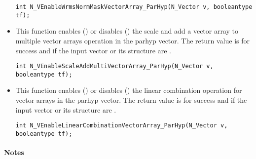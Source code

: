 \begin{itemize}
\verb|int N_VEnableWrmsNormMaskVectorArray_ParHyp(N_Vector v, booleantype tf);|


\item {}

This function enables () or disables () the scale and
add a vector array to multiple vector arrays operation in the parhyp vector. The
return value is  for success and  if the input vector or its
 structure are .

\verb|int N_VEnableScaleAddMultiVectorArray_ParHyp(N_Vector v, booleantype tf);|


\item {}

This function enables () or disables () the linear
combination operation for vector arrays in the parhyp vector. The return value
is  for success and  if the input vector or its  structure
are .

\verb|int N_VEnableLinearCombinationVectorArray_ParHyp(N_Vector v, booleantype tf);|

\end{itemize}
\paragraph{\bf Notes} 
           
